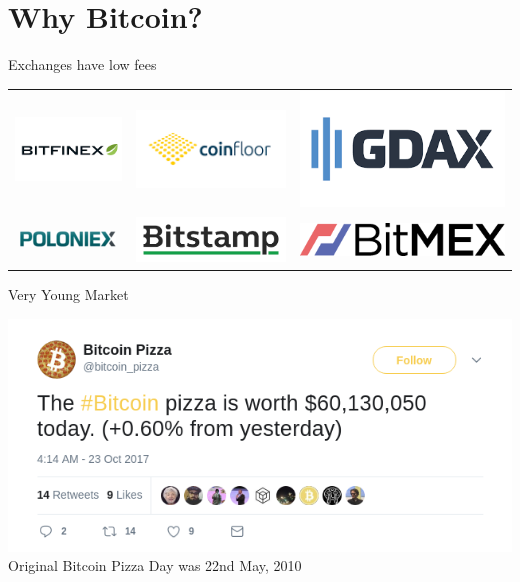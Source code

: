 \documentclass{beamer}
\begin{document}
\section{Why Bitcoin?}

\begin{frame}{Exchanges have \alert{low fees}}
  \begin{tabular}{c c c}
        \includegraphics[width=0.3\linewidth]{images/bitfinex} & \includegraphics[width=0.3\linewidth]{images/coinfloor} & \includegraphics[width=0.3\linewidth]{images/gdax}\\
        \includegraphics[width=0.3\linewidth]{images/poloniex} & \includegraphics[width=0.3\linewidth]{images/bitstamp} & \includegraphics[width=0.3\linewidth]{images/bitmex}
      \end{tabular}
\end{frame}


\begin{frame}{Very Young Market}
  \begin{center}
    \includegraphics[width=0.8\linewidth]{images/pizza_tweet}\\
    Original Bitcoin Pizza Day was 22nd May, 2010 \cite{BitPizza}
  \end{center}
\end{frame}
\end{document}
